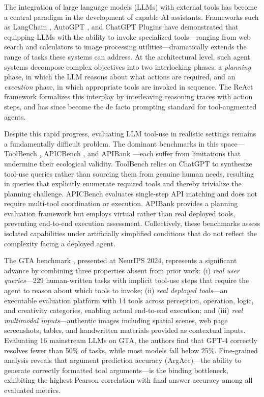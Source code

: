\documentclass[conference]{IEEEtran}
\begin{document}
The integration of large language models (LLMs) with external tools has become a central paradigm in the development of capable AI assistants. Frameworks such as LangChain \cite{chase2022langchain}, AutoGPT \cite{gravitas2023autogpt}, and ChatGPT Plugins have demonstrated that equipping LLMs with the ability to invoke specialized tools---ranging from web search and calculators to image processing utilities---dramatically extends the range of tasks these systems can address. At the architectural level, such agent systems decompose complex objectives into two interlocking phases: a \emph{planning} phase, in which the LLM reasons about what actions are required, and an \emph{execution} phase, in which appropriate tools are invoked in sequence. The ReAct framework \cite{yao2023react} formalizes this interplay by interleaving reasoning traces with action steps, and has since become the de facto prompting standard for tool-augmented agents.

Despite this rapid progress, evaluating LLM tool-use in realistic settings remains a fundamentally difficult problem. The dominant benchmarks in this space---ToolBench \cite{qin2023toolbench}, APICBench \cite{patil2023gorilla}, and APIBank \cite{li2023apibank}---each suffer from limitations that undermine their ecological validity. ToolBench relies on ChatGPT to synthesize tool-use queries rather than sourcing them from genuine human needs, resulting in queries that explicitly enumerate required tools and thereby trivialize the planning challenge. APICBench evaluates single-step API matching and does not require multi-tool coordination or execution. APIBank provides a planning evaluation framework but employs virtual rather than real deployed tools, preventing end-to-end execution assessment. Collectively, these benchmarks assess isolated capabilities under artificially simplified conditions that do not reflect the complexity facing a deployed agent.

The GTA benchmark \cite{wang2024gta}, presented at NeurIPS 2024, represents a significant advance by combining three properties absent from prior work: (i) \emph{real user queries}---229 human-written tasks with implicit tool-use steps that require the agent to reason about which tools to invoke; (ii) \emph{real deployed tools}---an executable evaluation platform with 14 tools across perception, operation, logic, and creativity categories, enabling actual end-to-end execution; and (iii) \emph{real multimodal inputs}---authentic images including spatial scenes, web page screenshots, tables, and handwritten materials provided as contextual inputs. Evaluating 16 mainstream LLMs on GTA, the authors find that GPT-4 correctly resolves fewer than 50\% of tasks, while most models fall below 25\%. Fine-grained analysis reveals that argument prediction accuracy (ArgAcc)---the ability to generate correctly formatted tool arguments---is the binding bottleneck, exhibiting the highest Pearson correlation with final answer accuracy among all evaluated metrics.
\end{document}
